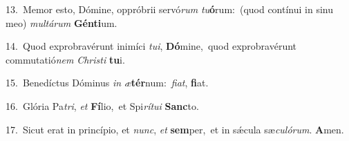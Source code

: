 {\numbfont\textcolor{\numbcolor}{13.}}~Memor esto, Dómine, oppróbrii servó\textit{rum} \textit{tu}\-\textbf{ó}rum:~\star (quod contínui in sinu meo) \textit{mul}\-\textit{tá}\textit{rum} \textbf{Gén}\-\textbf{ti}um.\par
{\numbfont\textcolor{\numbcolor}{14.}}~Quod exprobravérunt inimíci \textit{tu}\-\textit{i}, \textbf{Dó}\-mine,~\star quod exprobravérunt commutatió\textit{nem} \textit{Chris}\-\textit{ti} \textbf{tu}\-i.\par
{\numbfont\textcolor{\numbcolor}{15.}}~Benedíctus Dóminus \textit{in} \textit{æ}\-\textbf{tér}num:~\star \textit{fi}\-\textit{at}, \textbf{fi}\-at.\par
{\numbfont\textcolor{\numbcolor}{16.}}~Glória Pa\-\textit{tri}\-, \textit{et} \textbf{Fí}\-lio,~\star et Spi\-\textit{rí}\-\textit{tu}\textit{i} \textbf{Sanc}\-to.\par
{\numbfont\textcolor{\numbcolor}{17.}}~Sicut erat in princípio, et \textit{nunc}\-, \textit{et} \textbf{sem}\-per,~\star et in sǽcula sæ\-\textit{cu}\-\textit{ló}\textit{rum}. \textbf{A}\-men.\par
